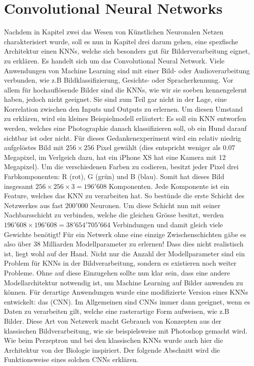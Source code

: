\chapter{Convolutional Neural Networks}\label{sec:CNN}
Nachdem in Kapitel zwei das Wesen von Künstlichen Neuronalen Netzen
charakterisiert wurde, soll es nun in Kapitel drei darum gehen, eine spezfische
Architektur einen KNNs, welche sich besonders gut für Bilderverarbeitung eignet,
zu erklären. Es handelt sich um das Convolutional Neural Network.
\para{}
Viele Anwendungen von Machine Learning sind mit einer Bild- oder
Audioverarbeitung verbunden, wie z.B Bildklassifizierung, Gesichts- oder
Spracherkennung.
Vor allem für hochauflösende Bilder sind die KNNs, wie wir sie soeben
kennengelernt haben, jedoch nicht geeignet. Sie sind zum Teil gar nicht in der
Lage, eine Korrelation zwischen den Inputs und Outputs zu erlernen.
Um diesen Umstand zu erklären, wird ein kleines Beispielmodell erläutert:
\para{}
\label{sec:CNN_parameter_problem}
Es soll ein KNN entworfen werden, welches eine Photographie danach klassifizieren
soll, ob ein Hund darauf sichtbar ist oder nicht. Für dieses
Gedankenexperiment wird ein relativ niedrig aufgelöstes Bild mit $256 \times 256$
Pixel gewählt (dies entspricht weniger als $0.07$ Megapixel, im Verlgeich dazu, hat ein iPhone XS hat eine Kamera mit
12 Megapixel). Um die verschiedenen Farben zu codieren, besitzt jeder Pixel drei
Farbkomponenten: R (rot), G (grün)
und B (blau). Somit hat dieses Bild insgesamt $256 \times 256 \times 3 = 196'608$
Komponenten. Jede Komponente ist ein Feature, welches das KNN zu verarbeiten hat. So bestünde
die erste Schicht des Netzwerkes aus fast $200'000$ Neuronen. Um diese Schicht
nun mit seiner Nachbarsschicht zu verbinden, welche die gleichen Grösse besitzt, werden
$196'608 \times 196'608 = 38'654'705'664$ Verbindungen und damit gleich
viele Gewichte benötigt! Für ein Netwerk ohne eine einzige Zwischenschichten gäbe es
also über 38 Milliarden Modellparameter zu erlernen! Dass dies nicht realistisch ist,
liegt wohl auf der Hand.
\para{}
Nicht nur die Anzahl der Modellparameter sind ein Problem für KNNs in der
Bildverarbeitung, sondern es existieren noch weiter Probleme.
Ohne auf diese Einzugehen sollte nun klar sein, dass eine andere Modellarchitektur notwendig ist, um Machine
Learning auf Bilder anwenden zu können. Für derartige Anwendungen wurde eine modifizierte
Version eines KNNs entwickelt: das  (CNN).
Im Allgemeinen sind CNNs immer dann geeignet, wenn es Daten zu verarbeiten gilt, welche eine
rasterartige Form aufweisen, wie z.B Bilder.
Diese Art von Netzwerk macht Gebrauch von Konzepten aus der klassischen
Bildverarbeitung, wie sie beispielsweise mit Photoshop gemacht wird.
Wie beim Perzeptron und bei den klassischen KNNs wurde auch hier die Architektur
von der Biologie inspiriert.
Der folgende Abschnitt wird die Funktionsweise eines solchen CNNs erklären.
\para{}
\cite{Goodfellow-et-al-2016}
\cite{deeplearning.ai:cnn}
\cite{wiki:cnn}


